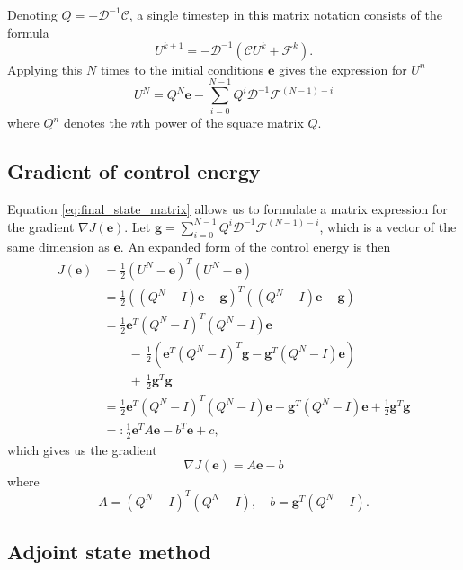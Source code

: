 \documentclass[utf8,english]{gradu3}
\begin{document}
Denoting $Q = -\mathcal{D}^{-1} \mathcal{C}$,
a single timestep in this matrix notation consists of the formula
\begin{equation}\label{eq:forward_timestep_matrix}
  U^{k+1} = -\mathcal{D}^{-1} (\mathcal{C} U^k + \mathcal{F}^k).
\end{equation}
Applying this $N$ times to the initial conditions $\mathbf{e}$ 
gives the expression for $U^n$
\begin{equation}\label{eq:final_state_matrix}
  U^N = Q^N \mathbf{e}
  - \sum_{i=0}^{N-1} Q^i \mathcal{D}^{-1} \mathcal{F}^{(N-1)-i}
\end{equation}
where $Q^n$ denotes the $n$th power of the square matrix $Q$.

\subsection{Gradient of control energy}

Equation \eqref{eq:final_state_matrix} allows us to formulate
a matrix expression for the gradient $\nabla J(\mathbf{e})$.
Let $\mathbf{g} = \sum_{i=0}^{N-1} Q^i \mathcal{D}^{-1} \mathcal{F}^{(N-1)-i}$,
which is a vector of the same dimension as $\mathbf{e}$.
An expanded form of the control energy is then
\begin{align*}
  J(\mathbf{e})
  &= \frac{1}{2} (U^N - \mathbf{e})^T (U^N - \mathbf{e}) \\
  &= \frac{1}{2} ((Q^N - I) \mathbf{e} - \mathbf{g})^T ((Q^N - I) \mathbf{e} - \mathbf{g}) \\
  &= \frac{1}{2} \mathbf{e}^T (Q^N - I)^T (Q^N - I) \mathbf{e} \\
  &\qquad -\, \frac{1}{2} (\mathbf{e}^T (Q^N - I)^T \mathbf{g}
    - \mathbf{g}^T (Q^N - I)\mathbf{e}) \\
  &\qquad +\, \frac{1}{2} \mathbf{g}^T \mathbf{g} \\
  &= \frac{1}{2} \mathbf{e}^T (Q^N - I)^T (Q^N - I) \mathbf{e}
  - \mathbf{g}^T (Q^N - I)\mathbf{e}
  + \frac{1}{2} \mathbf{g}^T \mathbf{g} \\
  &=: \frac{1}{2}\mathbf{e}^T A \mathbf{e} - b^T \mathbf{e} + c,
\end{align*}
which gives us the gradient
\begin{equation}\label{eq:control_gradient}
  \nabla J(\mathbf{e}) = A\mathbf{e} - b
\end{equation}
where
\[
  A = (Q^N - I)^T (Q^N - I),
  \quad b = \mathbf{g}^T (Q^N - I).
\]


\subsection{Adjoint state method}
\end{document}
